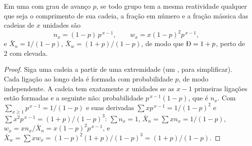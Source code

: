 \begin{theorem}\label{thm:b2:polymer-synthesis:flory}
Em uma  com grau de avanço $p$, se todo grupo tem a mesma reatividade qualquer que
seja o comprimento de sua cadeia, a fração em número e a fração mássica das cadeias de $x$ unidades são
\begin{equation*}
n_x = (1-p)\,p^{\,x-1}, \qquad w_x = x(1-p)^2 p^{\,x-1},
\end{equation*}
e $\bar X_n = 1/(1-p)$, $\bar X_w = (1+p)/(1-p)$, de modo que $\text{\DH} = 1 + p$, perto de 2 com
 elevada.
\end{theorem}

\begin{proof}
Siga uma cadeia a partir de uma extremidade (um  , para simplificar). Cada ligação ao
longo dela é formada com probabilidade $p$, de modo independente. A cadeia tem exatamente $x$ unidades
se as $x-1$ primeiras ligações estão formadas e a seguinte não: probabilidade $p^{\,x-1}(1-p)$, que é $n_x$. Com $\sum_{x\ge1} p^{\,x-1} =
1/(1-p)$ e suas derivadas $\sum x p^{\,x-1} = 1/(1-p)^2$ e $\sum x^2 p^{\,x-1} = (1+p)/(1-p)^3$:
$\sum n_x = 1$, $\bar X_n = \sum x n_x = 1/(1-p)$, $w_x = x n_x/\bar X_n = x(1-p)^2p^{\,x-1}$, e
$\bar X_w = \sum x w_x = (1-p)^2(1+p)/(1-p)^3 = (1+p)/(1-p)$.
\end{proof}

